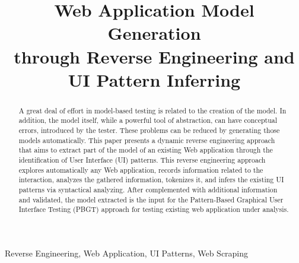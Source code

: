 \documentclass[conference]{IEEEtran}
\begin{document}
\title{Web Application Model Generation \\through Reverse Engineering and UI Pattern Inferring}

\author{
\and
{}
}







\maketitle

\begin{abstract}
A great deal of effort in model-based testing is related to the creation of the model. In addition, the model itself, while a powerful tool of abstraction, can have conceptual errors, introduced by the tester. These problems can be reduced by generating those models automatically. This paper presents a dynamic reverse engineering approach that aims to extract part of the model of an existing Web application through the identification of User Interface (UI) patterns. This reverse engineering approach explores automatically any Web application, records information related to the interaction, analyzes the gathered information, tokenizes it, and infers the existing UI patterns via syntactical analyzing. After complemented with additional information and validated, the model extracted is the input for the Pattern-Based Graphical User Interface Testing (PBGT) approach for testing existing web application under analysis.
\end{abstract}
\begin{IEEEkeywords} Reverse Engineering, Web Application, UI Patterns, Web Scraping \end{IEEEkeywords}
\end{document}
